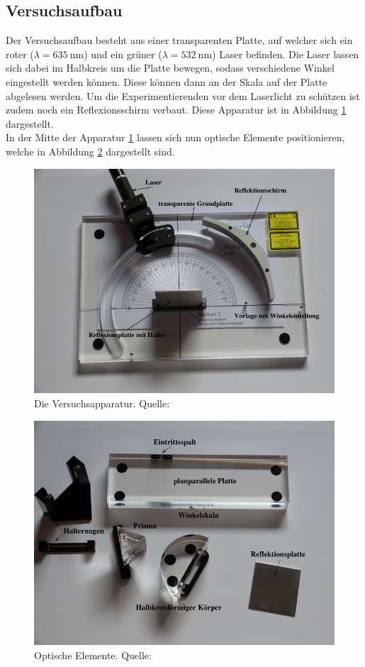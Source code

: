 \subsection{Versuchsaufbau}
\label{sec:aufbau}
Der Versuchsaufbau besteht aus einer transparenten Platte, auf welcher sich ein roter
($\lambda=\SI{635}{\nano\metre}$) und ein grüner ($\lambda=\SI{532}{\nano\metre}$) Laser
befinden. Die Laser lassen sich dabei im Halbkreis um die Platte bewegen, sodass verschiedene
Winkel eingestellt werden können. Diese können dann an der Skala auf der Platte abgelesen werden.
Um die Experimentierenden vor dem Laserlicht zu schützen ist zudem noch ein Reflexionsschirm
verbaut. Diese Apparatur ist in Abbildung \ref{fig:Aufbau} dargestellt.
\\\noindent
In der Mitte der Apparatur \ref{fig:Aufbau} lassen sich nun optische Elemente positionieren, welche
in Abbildung \ref{fig:Teile} dargestellt sind.
\begin{figure}[H]
    \centering
    \includegraphics[scale = 0.3]{pictures/Aufbau.png}
    \caption{Die Versuchsapparatur. Quelle: \cite{AP01}}
    \label{fig:Aufbau}
\end{figure}
\begin{figure}[H]
    \centering
    \includegraphics[scale = 0.3]{pictures/Teile.png}
    \caption{Optische Elemente. Quelle: \cite{AP01}}
    \label{fig:Teile}
\end{figure}


